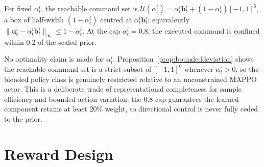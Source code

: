 \begin{proposition}\label{prop:boundeddeviation}
For fixed $\alpha_t^i$, the reachable command set is $\mathcal{U}(\alpha_t^i) = \alpha_t^i \mathbf{b}_t^i +
(1-\alpha_t^i)[-1,1]^6$, a box of half-width $(1-\alpha_t^i)$ centred at $\alpha_t^i \mathbf{b}_t^i$;
equivalently $\|\mathbf{u}_t^i - \alpha_t^i \mathbf{b}_t^i\|_\infty \le 1 - \alpha_t^i$. At the cap
$\alpha_t^i=0.8$, the executed command is confined within 0.2 of the scaled prior.
\end{proposition}

No optimality claim is made for $\alpha_t^i$. Proposition~\ref{prop:boundeddeviation} shows the
reachable command set is a strict subset of $[-1,1]^6$ whenever $\alpha_t^i > 0$, so the blended policy
class is genuinely restricted relative to an unconstrained MAPPO actor. This is a deliberate trade of
representational completeness for sample efficiency and bounded action variation: the 0.8 cap
guarantees the learned component retains at least 20\% weight, so directional control is never fully
ceded to the prior.

\section{Reward Design}\label{sec:alpha_reward}

